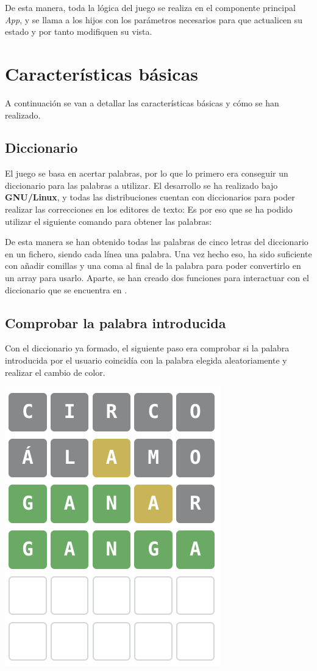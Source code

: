 \documentclass{\ClassPath/viu-tfm-template}
\begin{document}
De esta manera, toda la lógica del juego se realiza en el componente principal \textit{App}, y se llama a los hijos con los parámetros necesarios para que actualicen su estado y por tanto modifiquen su vista.

\section{Características básicas}
A continuación se van a detallar las características básicas y cómo se han realizado.

\subsection{Diccionario}
El juego se basa en acertar palabras, por lo que lo primero era conseguir un diccionario para las palabras a utilizar. El desarrollo se ha realizado bajo \textbf{GNU/Linux}, y todas las distribuciones cuentan con diccionarios para poder realizar las correcciones en los editores de texto: Es por eso que se ha podido utilizar el siguiente comando para obtener las palabras:


De esta manera se han obtenido todas las palabras de cinco letras del diccionario en un fichero, siendo cada línea una palabra. Una vez hecho eso, ha sido suficiente con añadir comillas y una coma al final de la palabra para poder convertirlo en un array para usarlo. Aparte, se han creado dos funciones para interactuar con el diccionario que se encuentra en .

\subsection{Comprobar la palabra introducida}
Con el diccionario ya formado, el siguiente paso era comprobar si la palabra introducida por el usuario coincidía con la palabra elegida aleatoriamente y realizar el cambio de color.

\vspace{-1em}
\begin{center}
    \includegraphics[width=0.3\linewidth]{img/juego1.png}
\end{center}
\vspace{-1em}
\end{document}
